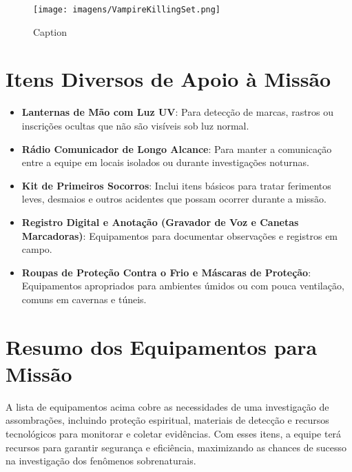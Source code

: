 \begin{figure}[hbt]
    \centering
    \texttt{[image: imagens/VampireKillingSet.png]}
    \caption{Caption}
    \label{fig:enter-label}
\end{figure}

\section{Itens Diversos de Apoio à Missão}

\begin{itemize}
    \item \textbf{Lanternas de Mão com Luz UV}: Para detecção de marcas, rastros ou inscrições ocultas que não são visíveis sob luz normal.

    \item \textbf{Rádio Comunicador de Longo Alcance}: Para manter a comunicação entre a equipe em locais isolados ou durante investigações noturnas.

    \item \textbf{Kit de Primeiros Socorros}: Inclui itens básicos para tratar ferimentos leves, desmaios e outros acidentes que possam ocorrer durante a missão.

    \item \textbf{Registro Digital e Anotação (Gravador de Voz e Canetas Marcadoras)}: Equipamentos para documentar observações e registros em campo.

    \item \textbf{Roupas de Proteção Contra o Frio e Máscaras de Proteção}: Equipamentos apropriados para ambientes úmidos ou com pouca ventilação, comuns em cavernas e túneis.
\end{itemize}

\section{Resumo dos Equipamentos para Missão}

A lista de equipamentos acima cobre as necessidades de uma investigação de assombrações, incluindo proteção espiritual, materiais de detecção e recursos tecnológicos para monitorar e coletar evidências. Com esses itens, a equipe terá recursos para garantir segurança e eficiência, maximizando as chances de sucesso na investigação dos fenômenos sobrenaturais.



